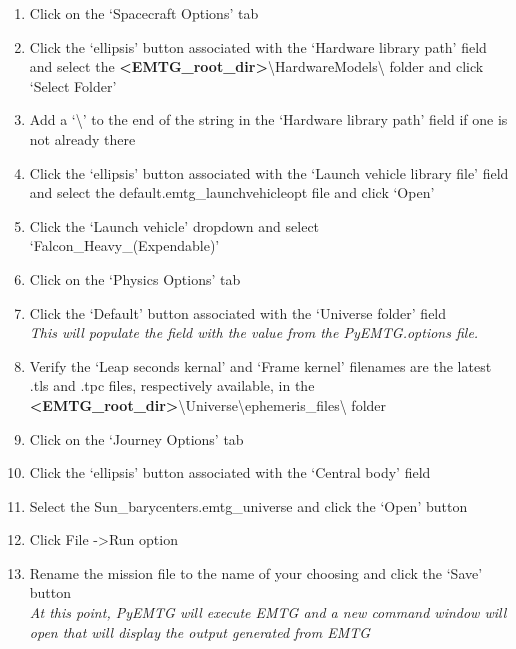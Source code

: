 \begin{enumerate}
	\item Click on the `Spacecraft Options' tab 
	\item Click the `ellipsis' button associated with the `Hardware library path' field and select the \textbf{\textless EMTG\_root\_dir\textgreater}\textbackslash HardwareModels\textbackslash \hspace{1pt} folder and click `Select Folder'
	\item Add a `\textbackslash' \hspace{1pt} to the end of the string in the `Hardware library path' field if one is not already there
	\item Click the `ellipsis' button associated with the `Launch vehicle library file' field and select the default.emtg\_launchvehicleopt file and click `Open'
	\item Click the `Launch vehicle' dropdown and select `Falcon\_Heavy\_(Expendable)'
	\item Click on the `Physics Options' tab 
	\item Click the `Default' button associated with the `Universe folder' field \\ \emph{This will populate the field with the value from the PyEMTG.options file.}
	\item Verify the `Leap seconds kernal' and `Frame kernel' filenames are the latest .tls and .tpc files, respectively available, in the \textbf{\textless EMTG\_root\_dir\textgreater}\textbackslash Universe\textbackslash ephemeris\_files\textbackslash \hspace{1pt} folder
	\item Click on the `Journey Options' tab 
	\item Click the `ellipsis' button associated with the `Central body' field
	\item Select the Sun\_barycenters.emtg\_universe and click the `Open' button
	\item Click File -\textgreater \hspace{1pt}Run option
	\item Rename the mission file to the name of your choosing and click the `Save' button \\ \emph{At this point, PyEMTG will execute EMTG and a new command window will open that will display the output generated from EMTG}
\end{enumerate}
